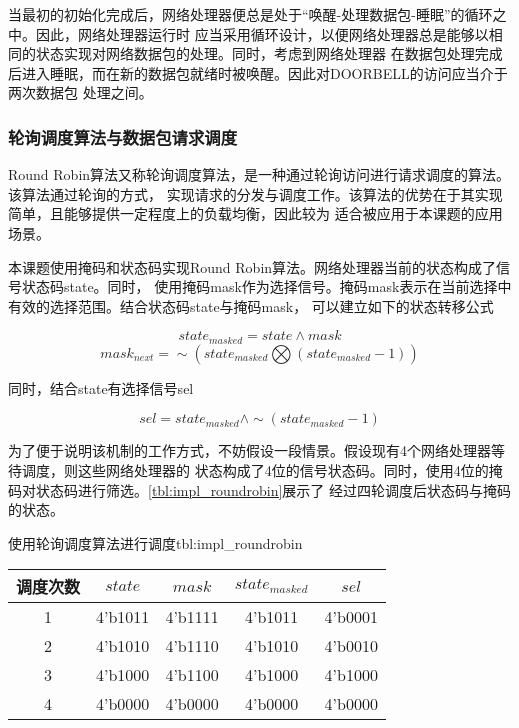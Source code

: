 
当最初的初始化完成后，网络处理器便总是处于“唤醒-处理数据包-睡眠”的循环之中。因此，网络处理器运行时
应当采用循环设计，以便网络处理器总是能够以相同的状态实现对网络数据包的处理。同时，考虑到网络处理器
在数据包处理完成后进入睡眠，而在新的数据包就绪时被唤醒。因此对DOORBELL的访问应当介于两次数据包
处理之间。

\subsubsection{轮询调度算法与数据包请求调度}

Round Robin算法又称轮询调度算法，是一种通过轮询访问进行请求调度的算法。该算法通过轮询的方式，
实现请求的分发与调度工作。该算法的优势在于其实现简单，且能够提供一定程度上的负载均衡，因此较为
适合被应用于本课题的应用场景。

本课题使用掩码和状态码实现Round Robin算法。网络处理器当前的状态构成了信号状态码state。同时，
使用掩码mask作为选择信号。掩码mask表示在当前选择中有效的选择范围。结合状态码state与掩码mask，
可以建立如下的状态转移公式

\begin{equation}
state_{masked} = state \land mask
\end{equation}
\begin{equation}
mask_{next} = \sim (state_{masked} \bigotimes (state_{masked} - 1))
\end{equation}

同时，结合state有选择信号sel

\begin{equation}
sel = state_{masked} \land \sim (state_{masked}-1)
\end{equation}

为了便于说明该机制的工作方式，不妨假设一段情景。假设现有4个网络处理器等待调度，则这些网络处理器的
状态构成了4位的信号状态码。同时，使用4位的掩码对状态码进行筛选。\autoref{tbl:impl_roundrobin}展示了
经过四轮调度后状态码与掩码的状态。

\begin{generaltab}{使用轮询调度算法进行调度}{tbl:impl_roundrobin}
  \begin{tabular}{c|cccc}
    \toprule
    调度次数 & $state$ & $mask$ & $state_{masked}$ & $sel$ \\
    \midrule
    1 & 4'b1011 & 4'b1111 & 4'b1011 & 4'b0001 \\
    2 & 4'b1010 & 4'b1110 & 4'b1010 & 4'b0010 \\
    3 & 4'b1000 & 4'b1100 & 4'b1000 & 4'b1000 \\
    4 & 4'b0000 & 4'b0000 & 4'b0000 & 4'b0000 \\
    \bottomrule
  \end{tabular}
\end{generaltab}

